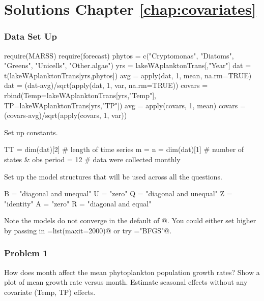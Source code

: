 

\chapter*{Solutions Chapter \ref{chap:covariates}}

\subsection*{Data Set Up}
\begin{Schunk}
\begin{Sinput}
 require(MARSS)
 require(forecast)
 phytos = c("Cryptomonas", "Diatoms", "Greens", 
             "Unicells", "Other.algae")
 yrs = lakeWAplanktonTrans[,"Year"]%in%1985:1994
 dat = t(lakeWAplanktonTrans[yrs,phytos])
 avg = apply(dat, 1, mean, na.rm=TRUE)
 dat = (dat-avg)/sqrt(apply(dat, 1, var, na.rm=TRUE))
 covars = rbind(Temp=lakeWAplanktonTrans[yrs,"Temp"],
                TP=lakeWAplanktonTrans[yrs,"TP"])
 avg = apply(covars, 1, mean)
 covars =  (covars-avg)/sqrt(apply(covars, 1, var))
\end{Sinput}
\end{Schunk}
Set up constants.
\begin{Schunk}
\begin{Sinput}
 TT = dim(dat)[2] # length of time series
 m = n = dim(dat)[1] # number of states & obs
 period = 12 # data were collected monthly
\end{Sinput}
\end{Schunk}
Set up the model structures that will be used across all the questions.
\begin{Schunk}
\begin{Sinput}
   B = "diagonal and unequal"
   U = "zero"
   Q = "diagonal and unequal"
   Z = "identity"
   A = "zero"
   R = "diagonal and equal"
\end{Sinput}
\end{Schunk}

Note the models do not converge in the default of @.  You could either set \verb@maxit@ higher by passing in \verb@control=list(maxit=2000)@ or try \verb@method="BFGS"@.  


\subsection*{Problem 1}
How does month affect the mean phytoplankton population growth rates? Show a plot of mean growth rate versus month. Estimate seasonal effects without any covariate (Temp, TP) effects.


